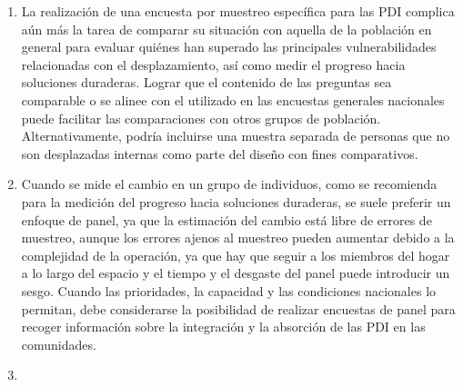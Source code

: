 \documentclass[
]{book}
\begin{document}
\begin{enumerate}
\item
  La realización de una encuesta por muestreo específica para las PDI complica aún más la tarea de comparar su situación con aquella de la población en general para evaluar quiénes han superado las principales vulnerabilidades relacionadas con el desplazamiento, así como medir el progreso hacia soluciones duraderas. Lograr que el contenido de las preguntas sea comparable o se alinee con el utilizado en las encuestas generales nacionales puede facilitar las comparaciones con otros grupos de población. Alternativamente, podría incluirse una muestra separada de personas que no son desplazadas internas como parte del diseño con fines comparativos.
\item
  Cuando se mide el cambio en un grupo de individuos, como se recomienda para la medición del progreso hacia soluciones duraderas, se suele preferir un enfoque de panel, ya que la estimación del cambio está libre de errores de muestreo, aunque los errores ajenos al muestreo pueden aumentar debido a la complejidad de la operación, ya que hay que seguir a los miembros del hogar a lo largo del espacio y el tiempo y el desgaste del panel puede introducir un sesgo. Cuando las prioridades, la capacidad y las condiciones nacionales lo permitan, debe considerarse la posibilidad de realizar encuestas de panel para recoger información sobre la integración y la absorción de las PDI en las comunidades.
\item ~
  \hypertarget{recomendaciuxf3n-de-encuestas-por-muestreo-para-medir-el-nuxfamero-de-pdi-en-el-futuro}{%
}
\end{enumerate}
\end{document}
